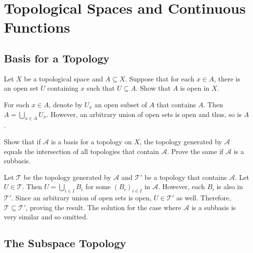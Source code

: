 \section{Topological Spaces and Continuous Functions}

\setcounter{subsection}{12}
\subsection{Basis for a Topology}

	\begin{exercise}
		Let $X$ be a topological space and $A\subseteq X$. Suppose that for each $x\in A$, there is an open set $U$ containing $x$ such that $U\subseteq A$. Show that $A$ is open in $X$.
	\end{exercise}
	\begin{solution*}
		For each $x\in A$, denote by $U_x$ an open subset of $A$ that contains $A$. Then $A = \bigcup_{x\in A} U_x$. However, an arbitrary union of open sets is open and thus, so is $A$.
	\end{solution*}

	\setcounter{exercise}{4}
	\begin{exercise}
		Show that if $\mathcal{A}$ is a basis for a topology on $X$, the topology generated by $\mathcal{A}$ equals the intersection of all topologies that contain $\mathcal{A}$. Prove the same if $\mathcal{A}$ is a subbasis.
	\end{exercise}
	\begin{solution*}
		Let $\mathcal{T}$ be the topology generated by $\mathcal{A}$ and $\mathcal{T}'$ be a topology that contains $\mathcal{A}$. Let $U\in\mathcal{T}$. Then $U=\bigcup_{i\in I} B_i$ for some $(B_i)_{i\in I}$ in $\mathcal{A}$. However, each $B_i$ is also in $\mathcal{T}'$. Since an arbitrary union of open sets is open, $U\in\mathcal{T'}$ as well. Therefore, $\mathcal{T}\subseteq\mathcal{T}'$, proving the result. The solution for the case where $\mathcal{A}$ is a subbasis is very similar and so omitted.
	\end{solution*}


\setcounter{subsection}{15}
\subsection{The Subspace Topology}

